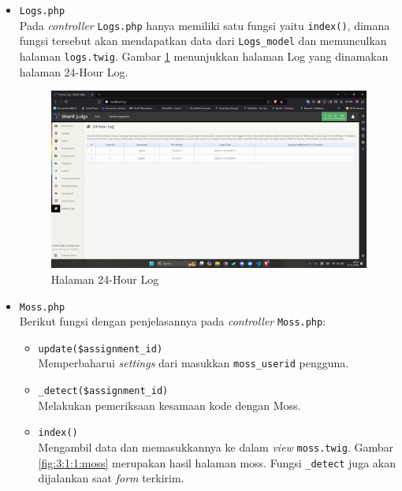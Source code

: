 \documentclass[a4paper,twoside]{article}
\begin{document}
\begin{enumerate}
\begin{itemize}
\begin{itemize}
\begin{itemize}
			                  \end{itemize}

			            \item \verb|Logs.php| \\
			                  Pada \textit{controller} \verb|Logs.php| hanya memiliki satu fungsi yaitu \verb|index()|, dimana fungsi tersebut akan mendapatkan data dari \verb|Logs_model| dan memunculkan halaman \verb|logs.twig|. Gambar \ref{fig:3:1:1:log} menunjukkan halaman Log yang dinamakan halaman 24-Hour Log.

			                  \begin{figure}[H]
				                  \centering
				                  \includegraphics[width=\textwidth]{views/log.png}
				                  \caption{Halaman 24-Hour Log}
				                  \label{fig:3:1:1:log}
			                  \end{figure}


			            \item \verb|Moss.php| \\
			                  Berikut fungsi dengan penjelasannya pada \textit{controller} \verb|Moss.php|:

			                  \begin{itemize}
				                  \item \verb|update($assignment_id)| \\
				                        Memperbaharui \textit{settings} dari masukkan \verb|moss_userid| pengguna.
				                  \item \verb|_detect($assignment_id)| \\
				                        Melakukan pemeriksaan kesamaan kode dengan Moss.
				                  \item \verb|index()| \\
				                        Mengambil data dan memasukkannya ke dalam \textit{view} \verb|moss.twig|. Gambar \ref{fig:3:1:1:moss} merupakan hasil halaman moss. Fungsi \verb|_detect| juga akan dijalankan saat \textit{form} terkirim.


\end{itemize}
\end{itemize}
\end{itemize}
\end{enumerate}
\end{document}
